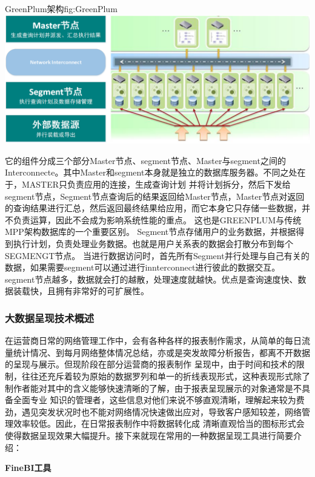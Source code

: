 \documentclass{HustGraduPaper}
\begin{document}
    \begin{generalfig}[htb]{GreenPlum架构}{fig:GreenPlum} 
        \includegraphics[width = \textwidth]{Figures/GreenPlum.png}
    \end{generalfig}

    它的组件分成三个部分Master节点、segment节点、Master与segment之间的Interconnecte。其中Master和segment本身就是独立的数据库服务器。不同之处在于，MASTER只负责应用的连接，生成查询计划
    并将计划拆分，然后下发给segment节点，Segment节点查询后的结果返回给Master节点，Master节点对返回的查询结果进行汇总，然后返回最终结果给应用，而它本身它只存储一些数据，并不负责运算，因此不会成为影响系统性能的重点。
    这也是GREENPLUM与传统MPP架构数据库的一个重要区别。 Segment节点存储用户的业务数据，并根据得到执行计划，负责处理业务数据。也就是用户关系表的数据会打散分布到每个SEGMENGT节点。
    当进行数据访问时，首先所有Segment并行处理与自己有关的数据，如果需要segment可以通过进行innterconnect进行彼此的数据交互。 segment节点越多，数据就会打的越散，处理速度就越快。优点是查询速度快、数据装载快，且拥有非常好的可扩展性。

    \subsubsection{大数据呈现技术概述}
    在运营商日常的网络管理工作中，会有各种各样的报表制作需求，从简单的每日流量统计情况、到每月网络整体情况总结，亦或是突发故障分析报告，都离不开数据的呈现与展示。但现阶段在部分运营商的报表制作
    呈现中，由于时间和技术的限制，往往还充斥着较为原始的数据罗列和单一的折线表现形式，这种表现形式除了制作者能对其中的含义能够快速清晰的了解，由于报表呈现展示的对象通常是不具备全面专业
    知识的管理者，这些信息对他们来说不够直观清晰，理解起来较为费劲，遇见突发状况时也不能对网络情况快速做出应对，导致客户感知较差，网络管理效率较低。因此，在日常报表制作中将数据转化成
    清晰直观恰当的图标形式会使得数据呈现效果大幅提升。接下来就现在常用的一种数据呈现工具进行简要介绍：

    {\songti \bfseries FineBI工具\\}
\end{document}
